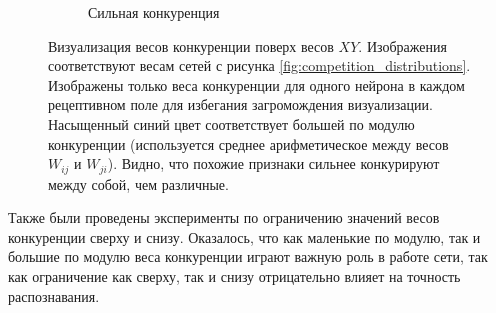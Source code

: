 \documentclass[a4paper]{article}
\begin{document}
\begin{figure}[H]
\begin{subfigure}{0.45\textwidth}
    \caption{Сильная конкуренция}
\end{subfigure} 
\caption{Визуализация весов конкуренции поверх весов $XY$. Изображения соответствуют весам сетей с рисунка \ref{fig:competition_distributions}. Изображены только веса конкуренции для одного нейрона в каждом рецептивном поле для избегания загромождения визуализации. Насыщенный синий цвет соответствует большей по модулю конкуренции (используется среднее арифметическое между весов $W_{ij}$ и $W_{ji}$). Видно, что похожие признаки сильнее конкурируют между собой, чем различные.}
\end{figure}

Также были проведены эксперименты по ограничению значений весов конкуренции сверху и снизу. Оказалось, что как маленькие по модулю, так и большие по модулю веса конкуренции играют важную роль в работе сети, так как ограничение как сверху, так и снизу отрицательно влияет на точность распознавания.
\end{document}
